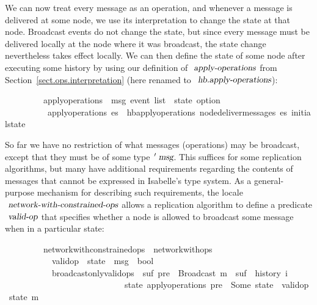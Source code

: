 We can now treat every message as an operation, and whenever a message is delivered at some node, we use its interpretation to change the state at that node.
Broadcast events do not change the state, but since every message must be delivered locally at the node where it was broadcast, the state change nevertheless takes effect locally.
We can then define the state of some node after executing some history by using our definition of $\isa{apply-operations}$ from Section~\ref{sect.ops.interpretation} (here renamed to $\isa{hb.apply-operations}$):
\vspace{0.35em}
\begin{isabellebody}
\ \ \ \ \ \ \ \ \ apply{\isacharunderscore}operations\ {\isacharcolon}{\isacharcolon}\ {\isachardoublequoteopen}{\isacharprime}msg\ event\ list\ {\isasymRightarrow}\ {\isacharprime}state\ option{\isachardoublequoteclose}\ \isanewline
\ \ \ \ \ \ \ \ \ \ {\isachardoublequoteopen}apply{\isacharunderscore}operations\ es\ {\isasymequiv}\ hb{\isachardot}apply{\isacharunderscore}operations\ {\isacharparenleft}node{\isacharunderscore}deliver{\isacharunderscore}messages\ es{\isacharparenright}\ initial{\isacharunderscore}state{\isachardoublequoteclose}
\end{isabellebody}
\vspace{0.35em}

So far we have no restriction of what messages (operations) may be broadcast, except that they must be of some type $\isacharprime\isa{msg}$.
This suffices for some replication algorithms, but many have additional requirements regarding the contents of messages that cannot be expressed in Isabelle's type system.
As a general-purpose mechanism for describing such requirements, the locale $\isa{network-with-constrained-ops}$ allows a replication algorithm to define a predicate $\isa{valid-op}$ that specifies whether a node is allowed to broadcast some message when in a particular state:
\vspace{0.35em}
\begin{isabellebody}
\ \ \ \ \ \ \ \ \ network{\isacharunderscore}with{\isacharunderscore}constrained{\isacharunderscore}ops\ {\isacharequal}\ network{\isacharunderscore}with{\isacharunderscore}ops\ {\isacharplus}\isanewline
\ \ \ \ \ \ \ \ \ \ \ valid{\isacharunderscore}op\ {\isacharcolon}{\isacharcolon}\ {\isachardoublequoteopen}{\isacharprime}state\ {\isasymRightarrow}\ {\isacharprime}msg\ {\isasymRightarrow}\ bool{\isachardoublequoteclose}\isanewline
\ \ \ \ \ \ \ \ \ \ \ broadcast{\isacharunderscore}only{\isacharunderscore}valid{\isacharunderscore}ops{\isacharcolon}\ {\isasymlbrakk}\ {\isachardoublequoteopen}{\isasymexists}suf{\isachardot}\ pre\ {\isacharat}\ {\isacharbrackleft}Broadcast\ m{\isacharbrackright}\ {\isacharat}\ suf\ {\isacharequal}\ history\ i \ {\isasymrbrakk}\ {\isasymLongrightarrow}\isanewline
\ \ \ \ \ \ \ \ \ \ \ \ \ \ \ \ \ \ \ \ \ \ \ \ \ \ \ \ {\isasymexists}state{\isachardot}\ apply{\isacharunderscore}operations\ pre\ {\isacharequal}\ Some\ state\ {\isasymand}\ valid{\isacharunderscore}op\ state\ m{\isachardoublequoteclose}
\end{isabellebody}
\vspace{0.35em}

